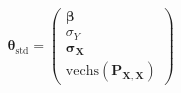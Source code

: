 \begin{equation}
	\boldsymbol{\theta}_{\mathrm{std}}
	=
	\left(
	\begin{array}{c}
		\boldsymbol{\beta}                  
		                                    \\
		\sigma_{Y}                          
		                                    \\
		\boldsymbol{\sigma}_{\boldsymbol{X}}    
		                                    \\
		\mathrm{vechs}                      
		\left(                              
		\boldsymbol{P}_{\boldsymbol{X}, \boldsymbol{X}} 
		\right)                             
	\end{array}
	\right)
\end{equation}
